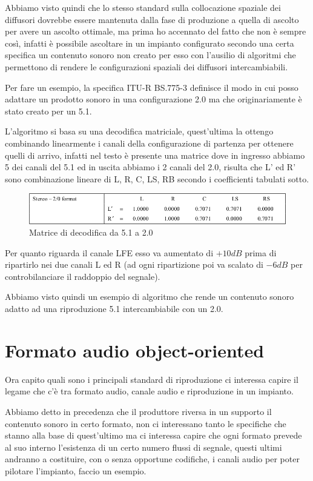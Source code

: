 \documentclass[12pt,a4paper]{report}
\begin{document}
Abbiamo visto quindi che lo stesso standard sulla collocazione spaziale dei diffusori dovrebbe essere mantenuta dalla fase di produzione a quella di ascolto per avere un ascolto ottimale, ma prima ho accennato del fatto che non è sempre così, infatti è possibile ascoltare in un impianto configurato secondo una certa specifica un contenuto sonoro non creato per esso con l'ausilio di algoritmi che permettono di rendere le configurazioni spaziali dei diffusori intercambiabili.

Per fare un esempio, la specifica ITU-R BS.775-3 definisce il modo in cui posso adattare un prodotto sonoro in una configurazione 2.0 ma che originariamente è stato creato per un 5.1.

L'algoritmo si basa su una decodifica matriciale, quest'ultima la ottengo combinando linearmente i canali della configurazione di partenza per ottenere quelli di arrivo, infatti nel testo è presente una matrice dove in ingresso abbiamo 5 dei canali del 5.1 ed in uscita abbiamo i 2 canali del 2.0, risulta che L' ed R' sono combinazione lineare di L, R, C, LS, RB secondo i coefficienti tabulati sotto.

\begin{figure}[htbp]
	\centering
	\includegraphics[scale=0.5]{figures/5-1to2-0.png}
	\caption {Matrice di decodifica da 5.1 a 2.0}
	\label{fig:decodifica}
	\end{figure}

Per quanto riguarda il canale LFE esso va aumentato di $+10dB$ prima di ripartirlo nei due canali L ed R (ad ogni ripartizione poi va scalato di $-6dB$ per controbilanciare il raddoppio del segnale).

Abbiamo visto quindi un esempio di algoritmo che rende un contenuto sonoro adatto ad una riproduzione 5.1 intercambiabile con un 2.0.

\section{Formato audio object-oriented}

Ora capito quali sono i principali standard di riproduzione ci interessa capire il legame che c'è tra formato audio, canale audio e riproduzione in un impianto. 

Abbiamo detto in precedenza che il produttore riversa in un supporto il contenuto sonoro in certo formato, non ci interessano tanto le specifiche che stanno alla base di quest'ultimo ma ci interessa capire che ogni formato prevede al suo interno l'esistenza di un certo numero flussi di segnale, questi ultimi andranno a costituire, con o senza opportune codifiche, i canali audio per poter pilotare l'impianto, faccio un esempio.
\end{document}

